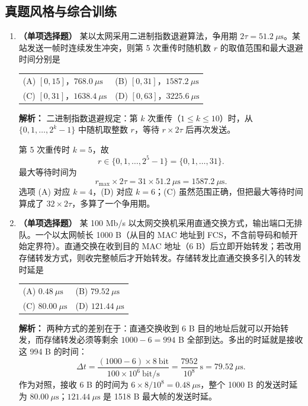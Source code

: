 \subsection{真题风格与综合训练}

\begin{enumerate}

\item \textbf{（单项选择题）} 某以太网采用二进制指数退避算法，争用期 $2\tau=51.2\ \mu\text{s}$。某站发送一帧时连续发生冲突，则第 5 次重传时随机数 $r$ 的取值范围和最大退避时间分别是
\begin{center}
\begin{tabular}{ll}
(A) $[0,15]$，$768.0\ \mu\text{s}$ & (B) $[0,31]$，$1587.2\ \mu\text{s}$ \\[4pt]
(C) $[0,31]$，$1638.4\ \mu\text{s}$ & (D) $[0,63]$，$3225.6\ \mu\text{s}$
\end{tabular}
\end{center}

\ifshowsolutions\par\noindent\textbf{解析：} 二进制指数退避规定：第 $k$ 次重传（$1\leqslant k\leqslant10$）时，从 $\{0,1,\dots,2^{k}-1\}$ 中随机取整数 $r$，等待 $r\times2\tau$ 后再次发送。

第 5 次重传时 $k=5$，故
\[
r\in\{0,1,\dots,2^{5}-1\}=\{0,1,\dots,31\}.
\]
最大等待时间为
\[
r_{\max}\times2\tau=31\times51.2\ \mu\text{s}=1587.2\ \mu\text{s}.
\]
选项 (A) 对应 $k=4$，(D) 对应 $k=6$；(C) 虽然范围正确，但把最大等待时间算成了 $32\times2\tau$，多算了一个争用期。\else \answerarea \fi

\item \textbf{（单项选择题）} 某 100 Mb/s 以太网交换机采用直通交换方式，输出端口无排队。一个以太网帧长 1000 B（从目的 MAC 地址到 FCS，不含前导码和帧开始定界符）。直通交换在收到目的 MAC 地址（6 B）后立即开始转发；若改用存储转发方式，则收完整帧后才开始转发。存储转发比直通交换多引入的转发时延是
\begin{center}
\begin{tabular}{ll}
(A) $0.48\ \mu\text{s}$ & (B) $79.52\ \mu\text{s}$ \\[4pt]
(C) $80.00\ \mu\text{s}$ & (D) $121.44\ \mu\text{s}$
\end{tabular}
\end{center}

\ifshowsolutions\par\noindent\textbf{解析：} 两种方式的差别在于：直通交换收到 6 B 目的地址后就可以开始转发，而存储转发必须等剩余 $1000-6=994$ B 全部到达。多出的时延就是接收这 994 B 的时间：
\[
\Delta t=\frac{(1000-6)\times8\ \text{bit}}{100\times10^{6}\ \text{bit/s}}
=\frac{7952}{10^{8}}\ \text{s}=79.52\ \mu\text{s}.
\]
作为对照，接收 6 B 的时间为 $6\times8/10^{8}=0.48\ \mu\text{s}$，整个 1000 B 的发送时延为 $80.00\ \mu\text{s}$；$121.44\ \mu\text{s}$ 是 1518 B 最大帧的发送时延。\else \answerarea \fi


\end{enumerate}
